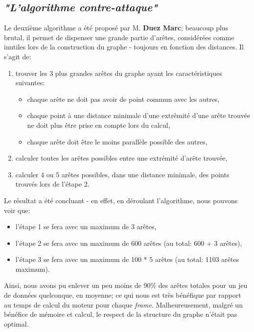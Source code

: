 \documentclass[pdftex,12pt,a4paper]{report}
\begin{document}
\begin{spacing}{1.2}
\subsection{\textit{"L'algorithme contre-attaque"}}
Le deuxième algorithme a été proposé par M. \textbf{Duez Marc}; beaucoup plus brutal, il permet de dispenser une grande partie d'arêtes, considérées comme inutiles lors de la construction du graphe - toujours en fonction des distances.
\newline
Il s'agit de:
\begin{enumerate}
\item trouver les 3 plus grandes arêtes du graphe ayant les caractéristiques suivantes:
	\begin{itemize}
	\item chaque arête ne doit pas avoir de point commun avec les autres,
	\item chaque point à une distance minimale d'une extrêmité d'une arête trouvée ne doit plus être prise en compte lors du calcul,
	\item chaque arête doit être le moins parallèle possible des autres,
	\end{itemize}
\item calculer toutes les arêtes possibles entre une extrémité d'arête trouvée,
\item calculer 4 ou 5 arêtes possibles, dans une distance minimale, des points trouvés lors de l'étape 2.
\end{enumerate}
Le résultat a été concluant - en effet, en déroulant l'algorithme, nous pouvons voir que:
\begin{itemize}
\item l'étape 1 se fera avec un maximum de 3 arêtes,
\item l'étape 2 se fera avec un maximum de 600 arêtes (au total: 600 + 3 arêtes),
\item l'étape 3 se fera avec un maximum de 100 * 5 arêtes (au total: 1103 arêtes maximum).
\end{itemize}
Ainsi, nous avons pu enlever un peu moins de 90\% des arêtes totales pour un jeu de données quelconque, en moyenne; ce qui nous est très bénéfique par rapport au temps de calcul du moteur pour chaque \textit{frame}. Malheureusement, malgré un bénéfice de mémoire et calcul, le respect de la structure du graphe n'était pas optimal.


\end{spacing}
\end{document}
